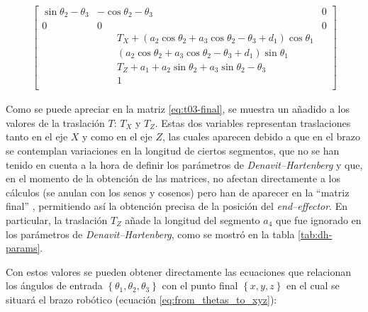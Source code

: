 \begin{align}
{\begin{bmatrix}
        \sin{\theta_{2} - \theta_{3}}                  & - \cos{\theta_{2} - \theta_{3}}                                                                                   & 0                  \\
        0                                              & 0                                                                                                                 & 0                  \\
                                                       & \qquad T_{X} + \left(a_{2} \cos{\theta_{2}} + a_{3} \cos{\theta_{2} - \theta_{3}} + d_{1}\right) \cos{\theta_{1}}                      \\
                                                       & \qquad \left(a_{2} \cos{\theta_{2}} + a_{3} \cos{\theta_{2} - \theta_{3}} + d_{1}\right) \sin{\theta_{1}}                              \\
                                                       & \qquad T_{Z} + a_{1} + a_{2} \sin{\theta_{2}} + a_{3} \sin{\theta_{2} - \theta_{3}}                                                    \\
                                                       & \qquad 1                                                                                                                               \\
    \end{bmatrix}}\label{eq:t03-final}
\end{align}

Como se puede apreciar en la matriz \ref{eq:t03-final}, se muestra un añadido a los valores
de la traslación $T$: $T_X$ y $T_Z$. Estas dos variables representan traslaciones tanto 
en el eje $X$ y como en el eje $Z$, las cuales aparecen debido a que en el brazo 
se contemplan variaciones en la longitud de ciertos segmentos, que no se han tenido en 
cuenta a la hora de definir los parámetros de \textit{Denavit--Hartenberg} y que, 
en el momento de la obtención de las matrices, no afectan directamente a los cálculos 
(se anulan con los senos y cosenos) pero han de aparecer en la ``matriz final'' ,
permitiendo así la obtención precisa de la posición del \textit{end--effector}. En particular, 
la traslación $T_Z$ añade la longitud del segmento $a_4$ que fue ignorado en los 
parámetros de \textit{Denavit--Hartenberg}, como se mostró en la tabla \ref{tab:dh-params}.

Con estos valores se pueden obtener directamente las ecuaciones que relacionan
los ángulos de entrada $\left\{\theta_1, \theta_2, \theta_3\right\}$ con el punto
final $\left\{x, y, z\right\}$ en el cual se situará el brazo robótico (ecuación
\ref{eq:from_thetas_to_xyz}):

